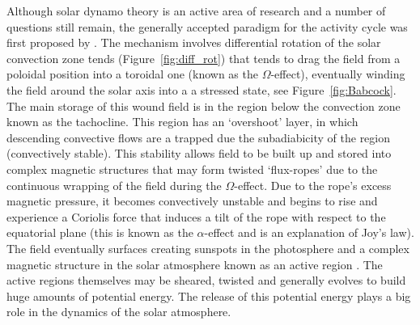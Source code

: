 

Although solar dynamo theory is an active area of research and a number of questions still remain, the generally accepted paradigm for the activity cycle was first proposed by \citet{babcock1961}. The mechanism involves differential rotation of the solar convection zone tends (Figure~\ref{fig:diff_rot}) that tends to drag the field from a poloidal position into a toroidal one (known as the $\Omega$-effect), eventually winding the field around the solar axis into a a stressed state, see Figure~\ref{fig:Babcock}. The main storage of this wound field is in the region below the convection zone known as the tachocline. This region has an `overshoot' layer, in which descending convective flows are a trapped due the subadiabicity of the region (convectively stable). This stability allows field to be built up and stored into complex magnetic structures that may form twisted `flux-ropes' due to the continuous wrapping of the field during the $\Omega$-effect. Due to the rope's excess magnetic pressure, it becomes convectively unstable and begins to rise and experience a Coriolis force that induces a tilt of the rope with respect to the equatorial plane (this is known as the $\alpha$-effect and is an explanation of Joy's law). The field eventually surfaces creating sunspots in the photosphere and a complex magnetic structure in the solar atmosphere known as an active region \citep{fan2009}. The active regions themselves may be sheared, twisted and generally evolves to build huge amounts of potential energy. The release of this potential energy plays a big role in the dynamics of the solar atmosphere.


